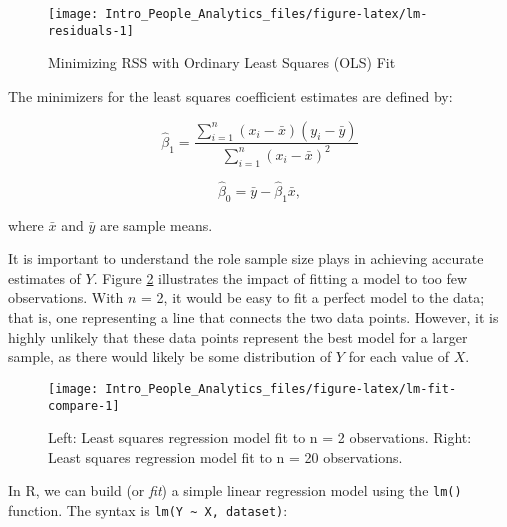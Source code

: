 \documentclass[
]{book}
\begin{document}
\begin{figure}

{\centering \texttt{[image: Intro\_People\_Analytics\_files/figure-latex/lm-residuals-1]} 

}

\caption{Minimizing RSS with Ordinary Least Squares (OLS) Fit}\label{fig:lm-residuals}
\end{figure}

The minimizers for the least squares coefficient estimates are defined by:

\[\hat\beta_1 = \frac{\displaystyle\sum_{i=1}^{n}(x_i - \bar{x})(y_i - \bar{y})} {\displaystyle\sum_{i=1}^{n}(x_i - \bar{x})^2}\]

\[\hat\beta_0 = \bar{y} - \hat{\beta}_1 \bar{x},\]

where \(\bar{x}\) and \(\bar{y}\) are sample means.

It is important to understand the role sample size plays in achieving accurate estimates of \(Y\). Figure \ref{fig:lm-fit-compare} illustrates the impact of fitting a model to too few observations. With \(n\) = 2, it would be easy to fit a perfect model to the data; that is, one representing a line that connects the two data points. However, it is highly unlikely that these data points represent the best model for a larger sample, as there would likely be some distribution of \(Y\) for each value of \(X\).

\begin{figure}

{\centering \texttt{[image: Intro\_People\_Analytics\_files/figure-latex/lm-fit-compare-1]} 

}

\caption{Left: Least squares regression model fit to n = 2 observations. Right: Least squares regression model fit to n = 20 observations.}\label{fig:lm-fit-compare}
\end{figure}

In R, we can build (or \emph{fit}) a simple linear regression model using the \texttt{lm()} function. The syntax is \texttt{lm(Y\ \textasciitilde{}\ X,\ dataset)}:
\end{document}
